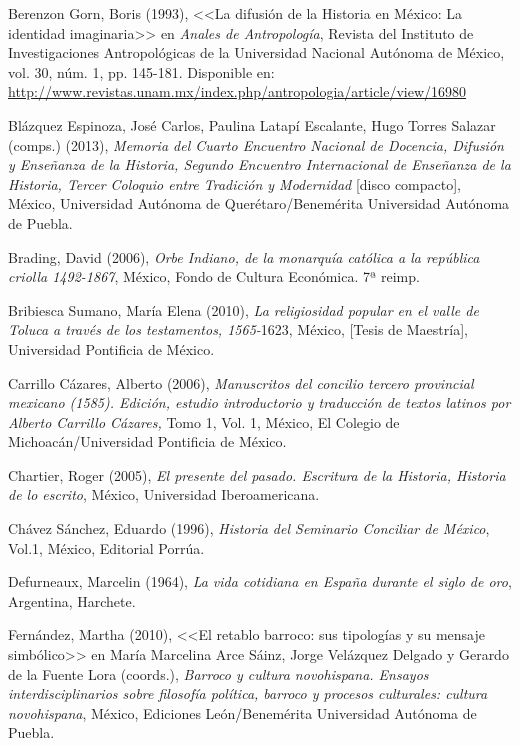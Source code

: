 Berenzon Gorn, Boris (1993), <<La difusión de la Historia en México: La identidad
imaginaria>> en \textit{Anales de Antropología}, Revista del Instituto de
Investigaciones Antropológicas de la Universidad Nacional Autónoma de México,
vol. 30, núm. 1, pp. 145-181. Disponible en:
\url{http://www.revistas.unam.mx/index.php/antropologia/article/view/16980}


Blázquez Espinoza, José Carlos, Paulina Latapí Escalante, Hugo Torres Salazar
(comps.) (2013), \textit{Memoria del Cuarto Encuentro Nacional de Docencia,
Difusión y Enseñanza de la Historia, Segundo Encuentro Internacional de
Enseñanza de la Historia, Tercer Coloquio entre Tradición y Modernidad} [disco
compacto], México, Universidad Autónoma de Querétaro\slash{}Benemérita Universidad
Autónoma de Puebla.


Brading, David (2006), \textit{Orbe Indiano, de la monarquía católica a la
república criolla 1492-1867}, México, Fondo de Cultura Económica. 7ª reimp.


Bribiesca Sumano, María Elena (2010), \textit{La religiosidad popular en el
valle de Toluca a través de los testamentos, 1565-}1623, México, [Tesis de
Maestría], Universidad Pontificia de México.
\newpage

Carrillo Cázares, Alberto (2006), \textit{Manuscritos del concilio tercero
provincial mexicano (1585). Edición, estudio introductorio y traducción de
textos latinos por Alberto Carrillo Cázares, }Tomo 1, Vol. 1, México, El
Colegio de Michoacán\slash{}Universidad Pontificia de México.


Chartier, Roger (2005), \textit{El presente del pasado. Escritura de la
Historia, Historia de lo escrito}, México, Universidad Iberoamericana.

 
Chávez Sánchez, Eduardo (1996), \textit{Historia del Seminario Conciliar de
México}, Vol.1, México, Editorial Porrúa.


Defurneaux, Marcelin (1964), \textit{La vida cotidiana en España durante el
siglo de oro}, Argentina, Harchete.

\begin{sloppypar}
Fernández, Martha (2010), <<El retablo barroco: sus tipologías y su mensaje
simbólico>> en María Marcelina Arce Sáinz, Jorge Velázquez Delgado y Gerardo de
la Fuente Lora (coords.), \textit{Barroco y cultura novohispana. Ensayos
interdisciplinarios sobre filosofía política, barroco y procesos culturales:
cultura novohispana}, México, Ediciones León\slash{}Benemérita Universidad Autónoma
de Puebla.
\end{sloppypar}

